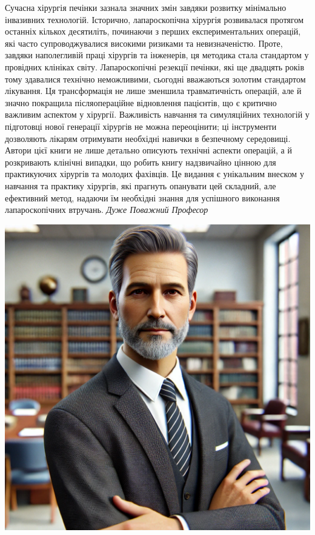 \newpage

\noindent
\begin{minipage}{0.65\textwidth}
Сучасна хірургія печінки зазнала значних змін завдяки розвитку мінімально інвазивних технологій. Історично, лапароскопічна хірургія розвивалася протягом останніх кількох десятиліть, починаючи з перших експериментальних операцій, які часто супроводжувалися високими ризиками та невизначеністю. Проте, завдяки наполегливій праці хірургів та інженерів, ця методика стала стандартом у провідних клініках світу. Лапароскопічні резекції печінки, які ще двадцять років тому здавалися технічно неможливими, сьогодні вважаються золотим стандартом лікування. Ця трансформація не лише зменшила травматичність операцій, але й значно покращила післяопераційне відновлення пацієнтів, що є критично важливим аспектом у хірургії. Важливість навчання та симуляційних технологій у підготовці нової генерації хірургів не можна переоцінити; ці інструменти дозволяють лікарям отримувати необхідні навички в безпечному середовищі. Автори цієї книги не лише детально описують технічні аспекти операцій, а й розкривають клінічні випадки, що робить книгу надзвичайно цінною для практикуючих хірургів та молодих фахівців. Це видання є унікальним внеском у навчання та практику хірургів, які прагнуть опанувати цей складний, але ефективний метод, надаючи їм необхідні знання для успішного виконання лапароскопічних втручань.  
\vspace{30pt} 
\vfill   
\hfill \textit{Дуже Поважний Професор}
\vfill  
\end{minipage}
\hfill
\begin{minipage}{0.3\textwidth}
    \centering
    \includegraphics[width=\textwidth]{Illustrations/Preface/image1.png}
\end{minipage}

